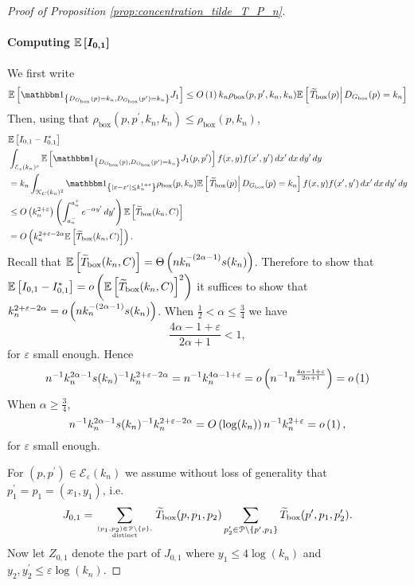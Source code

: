 \begin{proof}[Proof of Proposition \ref{prop:concentration_tilde_T_P_n}]
\paragraph{Computing $\bm{\mathbb{E}\left[I_{0,1}\right]}$}

We first write
\begin{equation}\label{eq:bound_E_J1}
	\Exp{\ind{\Dbox(p) = k_n, \Dbox(p^\prime) = k_n} J_1}
	\le \bigO{1} k_n \rho_{\text{box}}(p,p^\prime,k_n,k_n)\CExp{\widetilde{T}_{\text{box}}(p)}{\Dbox(p) = k_n}
\end{equation}
Then, using that $\rho_{\text{box}}(p,p^\prime,k_n,k_n) \le \rho_{\text{box}}(p,k_n)$,
\begin{align*}
	&\Exp{I_{0,1} - I_{0,1}^\ast}\\
	&\int_{\mathcal{E}_\varepsilon(k_n)^c}
		\Exp{\ind{\Dbox(p), \Dbox(p^\prime) = k_n} J_1(p,p^\prime)} f(x,y) f(x^\prime,y^\prime) \, dx^\prime \, dx \, dy^\prime \, dy\\
	&= k_n \int_{\Kcal_C(k_n)^2} \ind{|x-x^\prime| \le k_n^{1 + \varepsilon}}
		\rho_{\text{box}}(p,k_n)\CExp{\widetilde{T}_{\text{box}}(p)}{\Dbox(p) = k_n} f(x,y) f(x^\prime,y^\prime) \, dx^\prime \, dx \, dy^\prime \, dy\\
	&\le \bigO{k_n^{2+\varepsilon}} \left(\int_{a_n^-}^{a_n^+} e^{-\alpha y^\prime} \, dy^\prime\right) 
		\Exp{\widetilde{T}_{\text{box}}(k_n,C)}\\
	&= \bigO{k_n^{2 + \varepsilon - 2\alpha} \Exp{\widetilde{T}_{\text{box}}(k_n,C)}}.
\end{align*}
Recall that $\mathbb{E}\left[\widetilde{T}_{\text{box}}(k_n,C)\right] = \Theta\left(n k_n^{-(2\alpha - 1)}s(k_n)\right)$. Therefore to show that $\mathbb{E}\left[I_{0,1} - I_{0,1}^\ast\right] = o\left(\mathbb{E}\left[\widetilde{T}_{\text{box}}(k_n,C)\right]^2\right)$ it suffices to show that $k_n^{2 + \varepsilon - 2\alpha} = o\left(n k_n^{-(2\alpha - 1)}s(k_n)\right)$. When $\frac{1}{2} < \alpha \le \frac{3}{4}$ we have
\[
	\frac{4\alpha - 1 + \varepsilon}{2\alpha + 1} < 1,
\]
for $\varepsilon$ small enough. Hence
\[
	n^{-1} k_n^{2\alpha - 1} s(k_n)^{-1} k_n^{2 + \varepsilon -2\alpha} = n^{-1} k_n^{4\alpha - 1 + \varepsilon} 
	= o\left(n^{-1}n^{\frac{4\alpha - 1 + \varepsilon}{2\alpha + 1}}\right) = o\left(1\right)
\]
When $\alpha \ge \frac{3}{4}$,
\[
	n^{-1} k_n^{2\alpha - 1} s(k_n)^{-1} k_n^{2 + \varepsilon -2\alpha} = O\left(\log(k_n)\right) n^{-1} k_n^{2 + \varepsilon} = o\left(1\right),
\]
for $\varepsilon$ small enough.

For $(p,p^\prime) \in \mathcal{E}_\varepsilon(k_n)$ we assume without loss of generality that $p_1^\prime = p_1 = (x_1,y_1)$, i.e.
\[
	J_{0,1} = \sum_{(p_1, p_2) \in {\mathcal P} \setminus \{p\},\atop \text{distinct}} \widetilde{T}_{\text{box}}(p,p_1,p_2) 
	\sum_{p_2^\prime \in {\mathcal P} \setminus \{p^\prime, p_1\}} \widetilde{T}_{\text{box}}(p^\prime,p_1,p_2^\prime). 
\] 
Now let $Z_{0,1}$ denote the part of $J_{0,1}$ where $y_1 \le 4\log(k_n)$ and $y_2, y_2^\prime \le \varepsilon \log(k_n)$. 


\end{proof}
